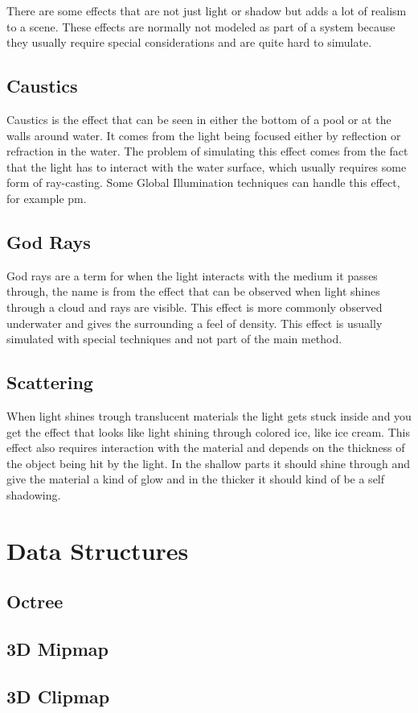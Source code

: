 There are some effects that are not just light or shadow but adds a lot of realism to a scene. These effects are normally not modeled as part of a system because they usually require special considerations and are quite hard to simulate.

\subsection{Caustics}

Caustics is the effect that can be seen in either the bottom of a pool or at the walls around water. It comes from the light being focused either by reflection or refraction in the water. The problem of simulating this effect comes from the fact that the light has to interact with the water surface, which usually requires some form of ray-casting. Some Global Illumination techniques can handle this effect, for example \gls{pm}.

\subsection{God Rays}

God rays are a term for when the light interacts with the medium it passes through, the name is from the effect that can be observed when light shines through a cloud and rays are visible. This effect is more commonly observed underwater and gives the surrounding a feel of density. This effect is usually simulated with special techniques and not part of the main method.

\subsection{Scattering}

When light shines trough translucent materials the light gets stuck inside and you get the effect that looks like light shining through colored ice, like ice cream. This effect also requires interaction with the material and depends on the thickness of the object being hit by the light. In the shallow parts it should shine through and give the material a kind of glow and in the thicker it should kind of be a self shadowing.

\section{Data Structures}

\subsection{Octree}

\subsection{3D Mipmap}

\subsection{3D Clipmap}